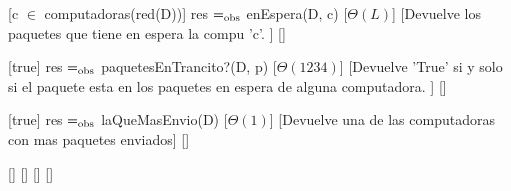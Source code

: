 \begin{Interfaz}
  [c $\in$ computadoras(red(D))]%
  {res $=_{\mathrm{obs}}$ enEspera(D, c)}%
  [$\Theta(L)$]%
  [Devuelve los paquetes que tiene en espera la compu 'c'. ]%
  []%

  [true]%
  {res $=_{\mathrm{obs}}$ paquetesEnTrancito?(D, p)}%
  [$\Theta(1234)$]%
  [Devuelve 'True' si y solo si el paquete esta en los paquetes en espera de alguna computadora. ]%
  []%

  [true]%
  {res $=_{\mathrm{obs}}$ laQueMasEnvio(D)}%
  [$\Theta(1)$]%
  [Devuelve una de las computadoras con mas paquetes enviados]%
  []%

  []%
  {}%
  []%
  []%
  []%

\end{Interfaz}

